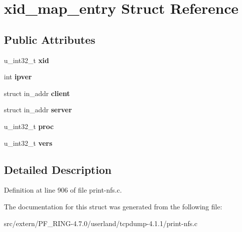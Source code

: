 \hypertarget{structxid__map__entry}{
\section{xid\_\-map\_\-entry Struct Reference}
\label{structxid__map__entry}
}
\subsection*{Public Attributes}
\begin{DoxyCompactItemize}
\item 
\hypertarget{structxid__map__entry_ab211aa2f15bc68903606fc30c1840c2d}{
u\_\-int32\_\-t {\bfseries xid}}
\label{structxid__map__entry_ab211aa2f15bc68903606fc30c1840c2d}

\item 
\hypertarget{structxid__map__entry_a36840e524c5e051b6cd624cf9b09ef4d}{
int {\bfseries ipver}}
\label{structxid__map__entry_a36840e524c5e051b6cd624cf9b09ef4d}

\item 
\hypertarget{structxid__map__entry_a4f50587aa148559839758bed75371ea0}{
struct in\_\-addr {\bfseries client}}
\label{structxid__map__entry_a4f50587aa148559839758bed75371ea0}

\item 
\hypertarget{structxid__map__entry_a7b8163a512ea50e49bed70ba11c4bc19}{
struct in\_\-addr {\bfseries server}}
\label{structxid__map__entry_a7b8163a512ea50e49bed70ba11c4bc19}

\item 
\hypertarget{structxid__map__entry_a02742bd36111e6d9e5af8e3eabfb09aa}{
u\_\-int32\_\-t {\bfseries proc}}
\label{structxid__map__entry_a02742bd36111e6d9e5af8e3eabfb09aa}

\item 
\hypertarget{structxid__map__entry_a1a3906a8a9f69793152da74928bdc133}{
u\_\-int32\_\-t {\bfseries vers}}
\label{structxid__map__entry_a1a3906a8a9f69793152da74928bdc133}

\end{DoxyCompactItemize}


\subsection{Detailed Description}


Definition at line 906 of file print-\/nfs.c.



The documentation for this struct was generated from the following file:\begin{DoxyCompactItemize}
\item 
src/extern/PF\_\-RING-\/4.7.0/userland/tcpdump-\/4.1.1/print-\/nfs.c\end{DoxyCompactItemize}
